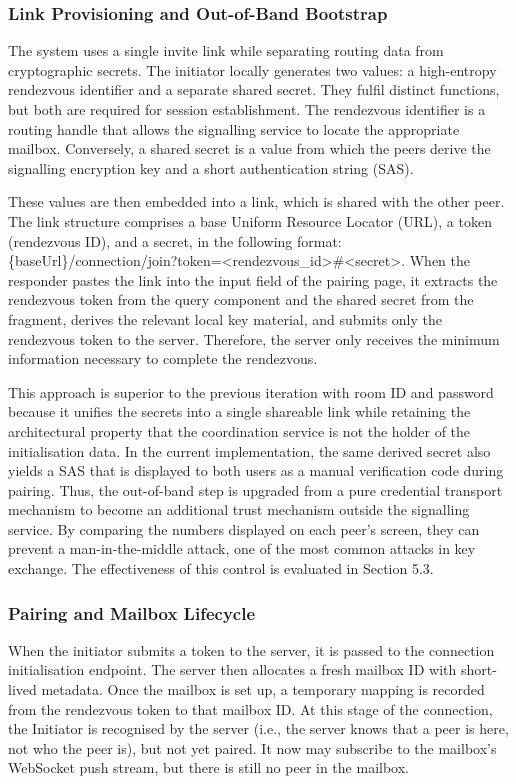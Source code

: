 \documentclass[12pt,a4paper]{article}
\begin{document}
\subsubsection{Link Provisioning and Out-of-Band Bootstrap}

The system uses a single invite link while separating routing data from cryptographic secrets. The initiator locally generates two values: a high-entropy rendezvous identifier and a separate shared secret. They fulfil distinct functions, but both are required for session establishment. The rendezvous identifier is a routing handle that allows the signalling service to locate the appropriate mailbox. Conversely, a shared secret is a value from which the peers derive the signalling encryption key and a short authentication string (SAS).

These values are then embedded into a link, which is shared with the other peer. The link structure comprises a base Uniform Resource Locator (URL), a token (rendezvous ID), and a secret, in the following format: \{baseUrl\}/connection/join?token=<rendezvous\_id>\#<secret>. When the responder pastes the link into the input field of the pairing page, it extracts the rendezvous token from the query component and the shared secret from the fragment, derives the relevant local key material, and submits only the rendezvous token to the server. Therefore, the server only receives the minimum information necessary to complete the rendezvous.

This approach is superior to the previous iteration with room ID and password because it unifies the secrets into a single shareable link while retaining the architectural property that the coordination service is not the holder of the initialisation data. In the current implementation, the same derived secret also yields a SAS that is displayed to both users as a manual verification code during pairing. Thus, the out-of-band step is upgraded from a pure credential transport mechanism to become an additional trust mechanism outside the signalling service. By comparing the numbers displayed on each peer’s screen, they can prevent a man-in-the-middle attack, one of the most common attacks in key exchange. The effectiveness of this control is evaluated in Section 5.3.

\subsubsection{Pairing and Mailbox Lifecycle}

When the initiator submits a token to the server, it is passed to the connection initialisation endpoint. The server then allocates a fresh mailbox ID with short-lived metadata. Once the mailbox is set up, a temporary mapping is recorded from the rendezvous token to that mailbox ID. At this stage of the connection, the Initiator is recognised by the server (i.e., the server knows that a peer is here, not who the peer is), but not yet paired. It now may subscribe to the mailbox’s WebSocket push stream, but there is still no peer in the mailbox.
\end{document}
